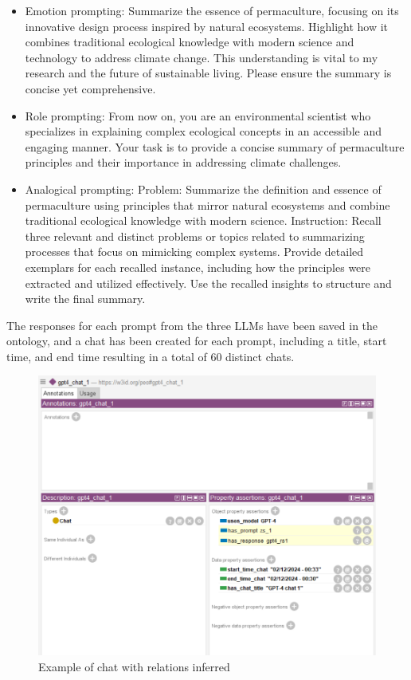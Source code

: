 \begin{itemize}
    \item Emotion prompting: Summarize the essence of permaculture, focusing on its innovative design process inspired by natural ecosystems. Highlight how it combines traditional ecological knowledge with modern science and technology to address climate change. This understanding is vital to my research and the future of sustainable living. Please ensure the summary is concise yet comprehensive.
    \item Role prompting: From now on, you are an environmental scientist who specializes in explaining complex ecological concepts in an accessible and engaging manner. Your task is to provide a concise summary of permaculture principles and their importance in addressing climate challenges.
    \item Analogical prompting: Problem: Summarize the definition and essence of permaculture using principles that mirror natural ecosystems and combine traditional ecological knowledge with modern science. Instruction: Recall three relevant and distinct problems or topics related to summarizing processes that focus on mimicking complex systems. Provide detailed exemplars for each recalled instance, including how the principles were extracted and utilized effectively. Use the recalled insights to structure and write the final summary.
\end{itemize}
The responses for each prompt from the three LLMs have been saved in the ontology, and a chat has been created for each prompt, including a title, start time, and end time resulting in a total of 60 distinct chats.
\begin{figure}[H]
    \centering
    \includegraphics[width=0.75\linewidth]{Figures/fig_32.png}
    \caption{Example of chat with relations inferred}
    \label{fig:enter-label}
\end{figure}

